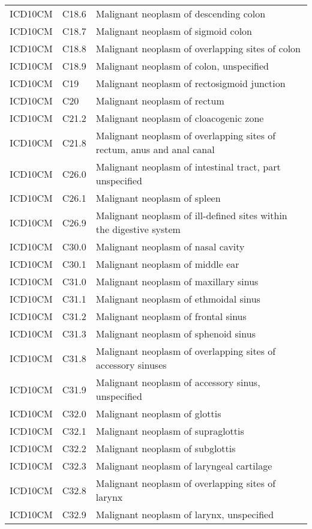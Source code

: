 \begin{longtable}{p{}p{}p{}}
  ICD10CM & C18.6 & Malignant neoplasm of descending colon \\ 
  ICD10CM & C18.7 & Malignant neoplasm of sigmoid colon \\ 
  ICD10CM & C18.8 & Malignant neoplasm of overlapping sites of colon \\ 
  ICD10CM & C18.9 & Malignant neoplasm of colon, unspecified \\ 
  ICD10CM & C19 & Malignant neoplasm of rectosigmoid junction \\ 
  ICD10CM & C20 & Malignant neoplasm of rectum \\ 
  ICD10CM & C21.2 & Malignant neoplasm of cloacogenic zone \\ 
  ICD10CM & C21.8 & Malignant neoplasm of overlapping sites of rectum, anus and anal canal \\ 
  ICD10CM & C26.0 & Malignant neoplasm of intestinal tract, part unspecified \\ 
  ICD10CM & C26.1 & Malignant neoplasm of spleen \\ 
  ICD10CM & C26.9 & Malignant neoplasm of ill-defined sites within the digestive system \\ 
  ICD10CM & C30.0 & Malignant neoplasm of nasal cavity \\ 
  ICD10CM & C30.1 & Malignant neoplasm of middle ear \\ 
  ICD10CM & C31.0 & Malignant neoplasm of maxillary sinus \\ 
  ICD10CM & C31.1 & Malignant neoplasm of ethmoidal sinus \\ 
  ICD10CM & C31.2 & Malignant neoplasm of frontal sinus \\ 
  ICD10CM & C31.3 & Malignant neoplasm of sphenoid sinus \\ 
  ICD10CM & C31.8 & Malignant neoplasm of overlapping sites of accessory sinuses \\ 
  ICD10CM & C31.9 & Malignant neoplasm of accessory sinus, unspecified \\ 
  ICD10CM & C32.0 & Malignant neoplasm of glottis \\ 
  ICD10CM & C32.1 & Malignant neoplasm of supraglottis \\ 
  ICD10CM & C32.2 & Malignant neoplasm of subglottis \\ 
  ICD10CM & C32.3 & Malignant neoplasm of laryngeal cartilage \\ 
  ICD10CM & C32.8 & Malignant neoplasm of overlapping sites of larynx \\ 
  ICD10CM & C32.9 & Malignant neoplasm of larynx, unspecified \\ 

\end{longtable}
